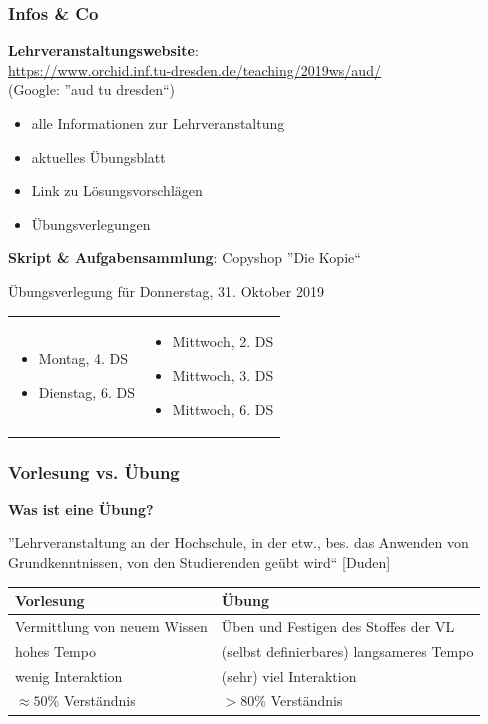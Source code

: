 \documentclass{beamer}
\begin{document}
	\begin{frame}\frametitle{Infos \& Co}
		\textbf{Lehrveranstaltungswebsite}: \\
		{\small \url{https://www.orchid.inf.tu-dresden.de/teaching/2019ws/aud/} \\
			(Google: ''aud tu dresden``)}
		\begin{itemize}
			\item alle Informationen zur Lehrveranstaltung
			\item aktuelles Übungsblatt
			\item Link zu Lösungsvorschlägen
			\item Übungsverlegungen
		\end{itemize}
		
		\pause 
		
		\textbf{Skript \& Aufgabensammlung}: Copyshop ''Die Kopie``
		
		\pause
		
		\begin{block}{Übungsverlegung für Donnerstag, 31. Oktober 2019}	
			\begin{tabularx}{\textwidth}{XX}
				\begin{itemize}[nolistsep]
					\item Montag, 4. DS 
					\item Dienstag, 6. DS
				\end{itemize} &%
				\begin{itemize}[nolistsep]
					\item Mittwoch, 2. DS
					\item Mittwoch, 3. DS
					\item Mittwoch, 6. DS
				\end{itemize}
			\end{tabularx}
		\end{block}
	\end{frame}

	\begin{frame} \frametitle{Vorlesung vs. Übung}
		\centering
		\textbf{Was ist eine Übung?}
		
		''Lehrveranstaltung an der Hochschule, in der etw., bes. das Anwenden von Grundkenntnissen, von den Studierenden geübt wird`` [Duden]
		
		\pause
		
		\begin{tabularx}{\linewidth}{X|X}
			\hline
			\textbf{Vorlesung} & \textbf{Übung} \\ \hline \hline
			Vermittlung von neuem Wissen & Üben und Festigen des Stoffes der VL \\ \hline
			hohes Tempo & (selbst definierbares) langsameres Tempo \\ \hline
			wenig Interaktion & (sehr) viel Interaktion \\ \hline
			$\approx 50\%$ Verständnis & $>80\%$ Verständnis \\
			\hline
		\end{tabularx}
	\end{frame}
\end{document}
